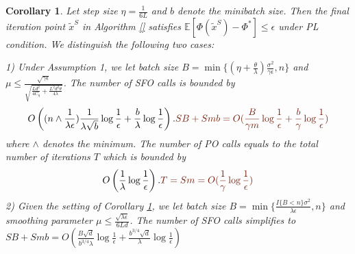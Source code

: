 \documentclass{article}
\newcommand*{\E}{\mathbb{E}}
\newtheorem{corollary}[theorem]{Corollary}
\theoremstyle{definition}
\theoremstyle{remark}
\begin{document}
\begin{corollary}\label{SC-CorI}
Let step size $\eta = \frac{1}{6L}$ and $b$ denote the minibatch size. Then the final iteration point $\tilde{x}^S$ in Algorithm \ref{} satisfies $\E[\Phi(\tilde{x}^S) - \Phi^*]\leq \epsilon$ under PL condition. We distinguish the following two cases:

1) Under Assumption 1, we let batch size $B = \min\{(\eta+\frac{\theta}{\lambda})\frac{\sigma ^2}{\gamma\epsilon}, n\}$ and {\color{Brown} $\mu \leq \frac{\sqrt{\gamma\epsilon}}{\sqrt{\frac{Ld^2}{4C_{\eta}}+\frac{ L^2d^2\theta}{4\lambda}}}$}. The number of SFO calls is bounded by
\[
O\left((n\wedge\frac{1}{\lambda \epsilon})\frac{1}{\lambda \sqrt{b}}\log \frac{1}{\epsilon}+\frac{b}{\lambda}\log\frac{1}{\epsilon}\right).{\color{Brown}SB+Smb = O( \frac{B}{\gamma m}\log\frac{1}{\epsilon}+\frac{b}{\gamma}\log\frac{1}{\epsilon})}
\]
where $\wedge$ denotes the minimum. The number of PO calls equals to the total number of iterations $T$ which is bounded by
\[
O\left(\frac{1}{\lambda}\log\frac{1}{\epsilon}\right).{\color{Brown} T = Sm = O(\frac{1}{\gamma}\log\frac{1}{\epsilon})}
\]
2) Given the setting  of Corollary \ref{SC-CorI}, we let batch size $B = \min\{\frac{I\{B < n\} \sigma ^2}{\lambda\epsilon}, n\}$ and smoothing parameter $\mu\leq\frac{\sqrt{\lambda\epsilon}}{6Ld}$. The number of SFO calls  simplifies to 
{\color{blue}$SB+Smb = O(\frac{B\sqrt{d}}{b^{3/4} \lambda}\log\frac{1}{\epsilon}+\frac{b^{3/4} \sqrt{d}}{\lambda}\log\frac{1}{\epsilon})$}
\end{corollary}
\end{document}
